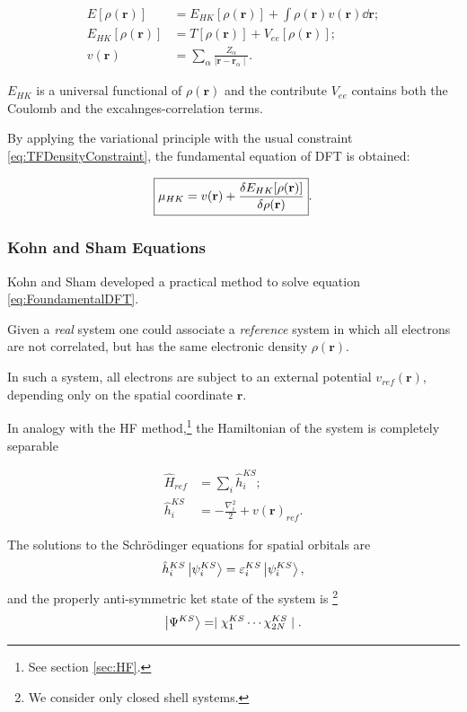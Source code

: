 \documentclass[a4paper,12pt]{article}
\newcommand\dens{\rho(\mathbf{r})}
\newcommand\erre{\mathbf{r}}
\begin{document}
\begin{align}
	E[\rho(\mathbf{r})] &= E_{HK}[\dens] + \int \rho(\mathbf{r}) v(\mathbf{r}) \dd{\mathbf{r}} ;\\
	E_{HK}[\dens] &= T[\rho(\mathbf{r})] + V_{ee}[\rho(\mathbf{r})] ;\\
	v(\mathbf{r}) &= \sum_{\alpha} \frac{Z_{\alpha}}{\mid \erre - \erre_{\alpha} \mid}.
\end{align}

$E_{HK}$ is a universal functional of $\dens$ and the contribute $V_{ee}$ contains both the Coulomb and the excahnges-correlation terms.

By applying the variational principle with the usual constraint \eqref{eq:TFDensityConstraint}, the fundamental equation of DFT is obtained:

\begin{equation}\label{eq:FoundamentalDFT}
\boxed{
	\mu_{HK} = v(\erre) + \frac{\var{E_{HK}[\dens]}}{\var{\dens}}
}.
\end{equation}


\subsubsection{Kohn and Sham Equations}

Kohn and Sham \cite{KS} developed a practical method to solve equation \eqref{eq:FoundamentalDFT}.

Given a \textit{real} system one could associate a \textit{reference} system in which all electrons are not correlated, but has the same electronic density $\dens$.

In such a system, all electrons are subject to an external potential $v_{ref}(\erre)$, depending only on the spatial coordinate $\erre$.\footnotemark


In analogy with the HF method,\footnote{See section \ref{sec:HF}.} the Hamiltonian of the system is completely separable

\begin{align}
\hat{H}_{ref} &= \sum_{i} \hat{h}_i^{KS} ;\\
\hat{h}_i^{KS} &= - \frac{\nabla^{2}_{i}}{2} + v(\erre)_{ref} .
\end{align}

The solutions to the Schr\"odinger equations for spatial orbitals are
\begin{equation} \label{eq:RawKSeq}
	\hat{h}_i^{KS} \ket{\psi_{i}^{KS}} = \varepsilon_{i}^{KS} \ket{\psi_{i}^{KS}} ,
\end{equation}
and the properly anti-symmetric ket state of the system is \footnote{We consider only closed shell systems.}
\begin{equation}
	\ket{\Psi^{KS}} = \mid \chi_{1}^{KS} \cdots \chi_{2N}^{KS} \mid .
\end{equation}
\end{document}
